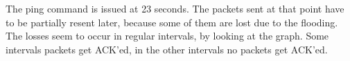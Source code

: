 The ping command is issued at 23 seconds. The packets sent at that point have to be partially resent later, because some of them are lost due to the flooding. The losses seem to occur in regular intervals, by looking at the graph. Some intervals packets get ACK'ed, in the other intervals no packets get ACK'ed.
